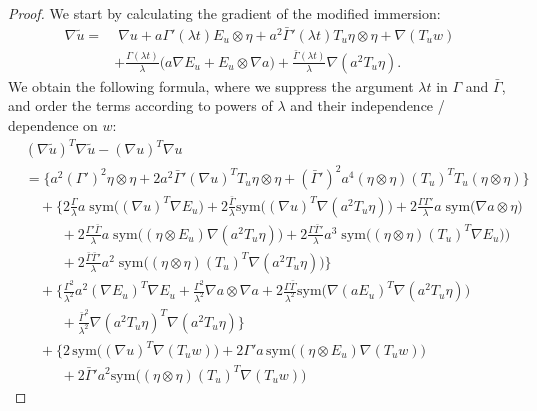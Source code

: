 \documentclass[reqno,twoside,11pt]{amsart}
\newcommand{\sym}{\mathrm{sym}}
\numberwithin{equation}{section}
\theoremstyle{plain}
\theoremstyle{definition}
\begin{document}
\begin{proof}
We start by calculating the gradient of the modified immersion:
\begin{equation*}
\begin{split}
\nabla \tilde u = & \;\nabla u + a\Gamma'(\lambda t) E_u\otimes \eta +
a^2 \bar\Gamma'(\lambda t) T_u \eta\otimes\eta + \nabla(T_u w)
\\ & + \frac{\Gamma(\lambda t)}{\lambda}\big(a\nabla E_u + E_u\otimes \nabla
a\big) +\frac{\bar\Gamma(\lambda t)}{\lambda}\nabla(a^2 T_u\eta).
\end{split}
\end{equation*}
We obtain the following formula, where we suppress the argument
$\lambda t$ in $\Gamma$ and $\bar\Gamma$, and order the terms
according to powers of $\lambda$ and their independence / dependence on $w$:
\begin{equation*}
\begin{split}
& (\nabla \tilde u)^T\nabla \tilde u - (\nabla u)^T\nabla u \\ & = 
\Big\{a^2 (\Gamma')^2\eta\otimes\eta + 2a^2 \bar\Gamma' (\nabla u)^T
T_u \eta\otimes\eta + (\bar\Gamma')^2a^4 (\eta\otimes\eta) (T_u)^TT_u(\eta\otimes\eta)\Big\}
\\ & \quad + \Big\{ 2 \frac{\Gamma}{\lambda} a\;\sym\big((\nabla u)^T\nabla E_u\big)
+ 2 \frac{\bar\Gamma}{\lambda} \sym\big((\nabla u)^T\nabla (a^2 T_u \eta)\big)
+ 2 \frac{\Gamma\Gamma'}{\lambda} a\;\sym\big(\nabla a\otimes\eta\big)
\\ & \qquad \; \; + 2 \frac{\Gamma'\bar\Gamma}{\lambda}
a\;\sym\big((\eta\otimes E_u)\nabla (a^2 T_u \eta)\big)  
+ 2 \frac{\Gamma\bar\Gamma'}{\lambda} a^3\;\sym\big((\eta\otimes\eta)(T_u)^T\nabla E_u)\big)
\\ & \qquad \; \;  + 2 \frac{\bar\Gamma\bar\Gamma'}{\lambda}
a^2\;\sym\big((\eta\otimes\eta)(T_u)^T\nabla( a^2T_u\eta)\big) \Big\}
\\ & \quad + \Big\{ \frac{\Gamma^2}{\lambda^2}a^2 (\nabla E_u)^T\nabla E_u
+ \frac{\Gamma^2}{\lambda^2}\nabla a\otimes\nabla a 
+ 2\frac{\Gamma\bar\Gamma}{\lambda^2}\sym\big(\nabla(aE_u)^T \nabla(a^2T_u\eta) \big)
\\ & \qquad \; \; + \frac{\bar\Gamma^2}{\lambda^2}\nabla(a^2T_u\eta)^T \nabla(a^2T_u\eta) \Big\}
\\ & \quad + \Big\{ 2 \,\sym\big((\nabla u)^T\nabla (T_uw)\big) + 2\Gamma' a\,
\sym\big((\eta\otimes E_u) \nabla(T_uw)\big) 
\\ & \qquad \; \; + 2 \bar\Gamma' a^2 \sym\big((\eta\otimes\eta)(T_u)^T\nabla(T_uw)\big)

\end{split}
\end{equation*}
\end{proof}
\end{document}
